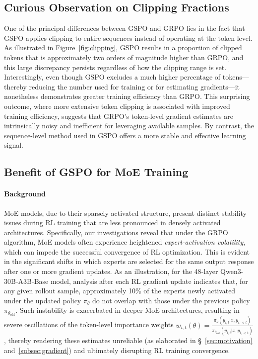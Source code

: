 \subsection{Curious Observation on Clipping Fractions}

One of the principal differences between GSPO and GRPO lies in the fact that GSPO applies clipping to entire sequences instead of operating at the token level. As illustrated in Figure~\ref{fig:clipping}, GSPO results in a proportion of clipped tokens that is approximately two orders of magnitude higher than GRPO, and this large discrepancy persists regardless of how the clipping range is set. Interestingly, even though GSPO excludes a much higher percentage of tokens—thereby reducing the number used for training or for estimating gradients—it nonetheless demonstrates greater training efficiency than GRPO. This surprising outcome, where more extensive token clipping is associated with improved training efficiency, suggests that GRPO’s token-level gradient estimates are intrinsically noisy and inefficient for leveraging available samples. By contrast, the sequence-level method used in GSPO offers a more stable and effective learning signal.

\subsection{Benefit of GSPO for MoE Training}
\label{subsec:routing_replay}

\paragraph{Background}
MoE models, due to their sparsely activated structure, present distinct stability issues during RL training that are less pronounced in densely activated architectures. Specifically, our investigations reveal that under the GRPO algorithm, MoE models often experience heightened \textit{expert-activation volatility}, which can impede the successful convergence of RL optimization. This is evident in the significant shifts in which experts are selected for the same output response after one or more gradient updates. As an illustration, for the 48-layer Qwen3-30B-A3B-Base model, analysis after each RL gradient update indicates that, for any given rollout sample, approximately 10\% of the experts newly activated under the updated policy $\pi_{\theta}$ do not overlap with those under the previous policy $\pi_{\theta_\text{old}}$. Such instability is exacerbated in deeper MoE architectures, resulting in severe oscillations of the token-level importance weights $w_{i,t}(\theta) = \frac{ \pi_{\theta} (y_{i,t} | x, y_{i,<t}) }{ \pi_{\theta_\text{old}} (y_{i,t} | x,y_{i,<t})}$, thereby rendering these estimates unreliable (as elaborated in \S~\ref{sec:motivation} and~\ref{subsec:gradient}) and ultimately disrupting RL training convergence.

